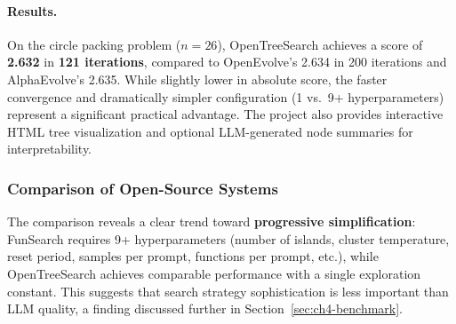 \paragraph{Results.}
On the circle packing problem ($n=26$), OpenTreeSearch achieves a score of \textbf{2.632} in \textbf{121 iterations}, compared to OpenEvolve's 2.634 in 200 iterations and AlphaEvolve's 2.635. While slightly lower in absolute score, the faster convergence and dramatically simpler configuration (1 vs.\ 9+ hyperparameters) represent a significant practical advantage. The project also provides interactive HTML tree visualization and optional LLM-generated node summaries for interpretability.


\subsubsection{Comparison of Open-Source Systems}

\begin{table}[htbp]
\centering
{}
\caption{Open-source evolutionary code systems. A clear trend toward progressive simplification: from FunSearch's 9+ hyperparameters to OpenTreeSearch's single parameter.}
\label{tab:opensource-compare}
\end{table}

The comparison reveals a clear trend toward \textbf{progressive simplification}: FunSearch requires 9+ hyperparameters (number of islands, cluster temperature, reset period, samples per prompt, functions per prompt, etc.), while OpenTreeSearch achieves comparable performance with a single exploration constant. This suggests that search strategy sophistication is less important than LLM quality, a finding discussed further in Section~\ref{sec:ch4-benchmark}.

